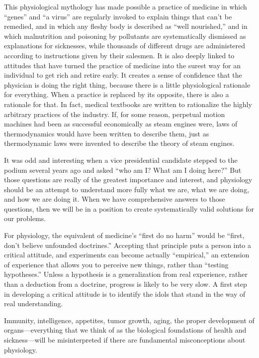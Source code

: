 \documentclass{article}
\begin{document}
This physiological mythology has made possible a practice of medicine in which “genes” and “a virus” are regularly invoked to explain things that can’t be remedied, and in which any fleshy body is described as “well nourished,” and in which malnutrition and poisoning by pollutants are systematically dismissed as explanations for sicknesses, while thousands of different drugs are administered according to instructions given by their salesmen. It is also deeply linked to attitudes that have turned the practice of medicine into the surest way for an individual to get rich and retire early. It creates a sense of confidence that the physician is doing the right thing, because there is a little physiological rationale for everything. When a practice is replaced by its opposite, there is also a rationale for that. In fact, medical textbooks are written to rationalize the highly arbitrary practices of the industry. If, for some reason, perpetual motion machines had been as successful economically as steam engines were, laws of thermodynamics would have been written to describe them, just as thermodynamic laws were invented to describe the theory of steam engines.

It was odd and interesting when a vice presidential candidate stepped to the podium several years ago and asked “who am I? What am I doing here?” But those questions are really of the greatest importance and interest, and physiology should be an attempt to understand more fully what we are, what we are doing, and how we are doing it. When we have comprehensive answers to those questions, then we will be in a position to create systematically valid solutions for our problems.

For physiology, the equivalent of medicine’s “first do no harm” would be “first, don’t believe unfounded doctrines.” Accepting that principle puts a person into a critical attitude, and experiments can become actually “empirical,” an extension of experience that allows you to perceive new things, rather than “testing hypotheses.” Unless a hypothesis is a generalization from real experience, rather than a deduction from a doctrine, progress is likely to be very slow. A first step in developing a critical attitude is to identify the idols that stand in the way of real understanding.

Immunity, intelligence, appetites, tumor growth, aging, the proper development of organs—everything that we think of as the biological foundations of health and sickness—will be misinterpreted if there are fundamental misconceptions about physiology.
\end{document}
